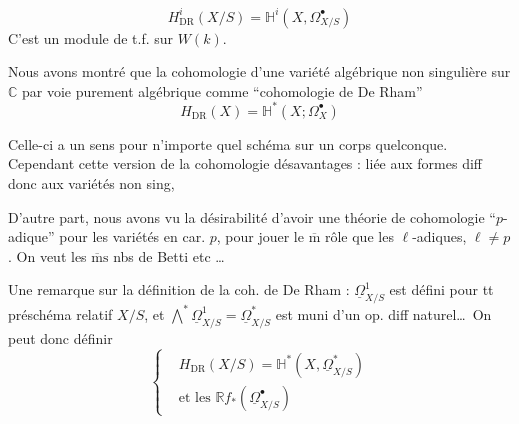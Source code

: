\[
\boxed{H^i_{\mathrm{DR}}(X/S)=\mathbb H^i(X,\Omega^\bullet_{X/S})}
\]
C'est un module de t.f. sur $W(k)$.




Nous avons montré que la cohomologie   d'une variété algébrique non singulière sur $\mathbb C$  par voie purement algébrique comme ``cohomologie de De Rham''
\[
H_{\mathrm{DR}}(X)=\mathbb H^*(X;\Omega_X^\bullet)
\]

Celle-ci a un sens pour n'importe quel schéma sur un corps quelconque. Cependant cette version de la cohomologie  désavantages : liée aux formes diff donc aux variétés non sing, 

D'autre part, nous avons vu la désirabilité d'avoir une théorie de cohomologie ``$p$-adique'' pour les variétés en car. $p$, pour jouer le $\overline{\mathrm m}$ rôle que les  $\ell$-adiques, $\ell\ne p$. On veut les $\overline{\mathrm m}\mathrm s$ nbs de Betti etc \ldots

Une remarque sur la définition de la coh. de De Rham : $\underline{\Omega}^1_{X/S}$ est défini pour tt préschéma relatif $X/S$, et $\bigwedge^*\underline{\Omega}^1_{X/S}=\underline{\Omega}^*_{X/S}$ est muni d'un op. diff naturel\ldots\ On peut donc définir
\[
\left\{
\begin{aligned}
&H_{\mathrm{DR}}(X/S)=\mathbb H^*(X,\underline{\Omega}^*_{X/S})\\
&\text{et les }\mathbb R f_*(\underline{\Omega}^\bullet_{X/S})
\end{aligned}
\right.
\]



